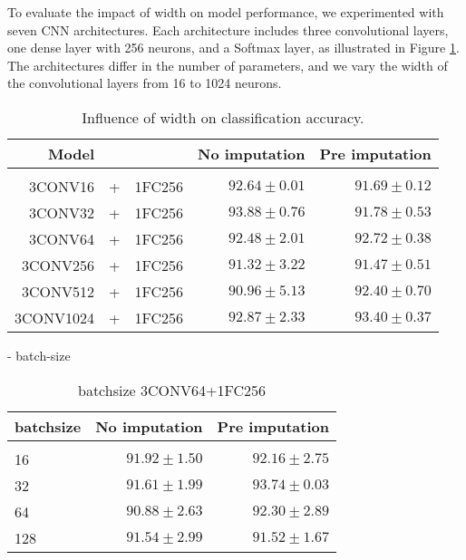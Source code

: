 To evaluate the impact of width on model performance, we experimented with seven CNN architectures.
Each architecture includes three convolutional layers, one dense layer with 256 neurons, and a Softmax layer, as illustrated in Figure \ref{tab:temCNNwidth}.
The architectures differ in the number of parameters, and we vary the width of the convolutional layers from 16 to 1024 neurons.


 \begin{table}[!htbp]
  \centering
   \begin{tabular}{rclrr}
   Model&&                  & No imputation         & Pre imputation             \\[0.2cm]
   \hline \\[-0.2cm]
    3CONV16 &+& 1FC256    	 & $92.64 \pm 0.01$ 	 & $91.69 \pm 0.12$\\
    3CONV32 &+& 1FC256    	 & $\mathbf{93.88 \pm 0.76}$ 	 & $91.78 \pm 0.53$\\
    3CONV64 &+& 1FC256    	 & $92.48 \pm 2.01$ 	 & $92.72 \pm 0.38$\\
    3CONV256 &+& 1FC256   	 & $91.32 \pm 3.22$ 	 & $91.47 \pm 0.51$\\
    3CONV512 &+& 1FC256   	 & $90.96 \pm 5.13$ 	 & $92.40 \pm 0.70$\\
    3CONV1024 &+& 1FC256  	 & $92.87 \pm 2.33$ 	 & $\mathbf{93.40 \pm 0.37}$\\
   \end{tabular}
   \caption{Influence of width on classification accuracy.}
   \label{tab:temCNNwidth}
 \end{table}




 
- batch-size

\begin{table}[!htbp]
  \centering
   \begin{tabular}{lrr}
   batchsize                  & No imputation         & Pre imputation             \\[0.2cm]
   \hline \\[-0.2cm]
    16  	 & $91.92 \pm 1.50$ 	 & $92.16 \pm 2.75$\\
    32  	 & $\mathbf{91.61 \pm 1.99}$ 	 & $\mathbf{93.74 \pm 0.03}$\\
    64  	 & $90.88 \pm 2.63$ 	 & $92.30 \pm 2.89$\\
    128  	 & $91.54 \pm 2.99$ 	 & $91.52 \pm 1.67$\\
   \end{tabular}
   \caption{batchsize 3CONV64+1FC256}
 \end{table}


